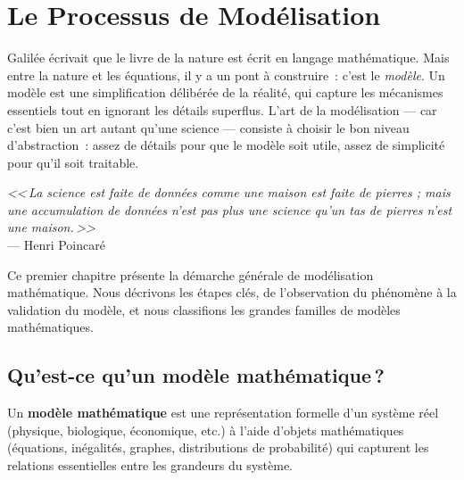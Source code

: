 \chapter{Le Processus de Mod\'elisation}
\label{ch:processus}

Galil\'ee \'ecrivait que le livre de la nature est \'ecrit en langage
math\'ematique. Mais entre la nature et les \'equations, il y a un pont \`a
construire~: c'est le \emph{mod\`ele}. Un mod\`ele est une simplification
d\'elib\'er\'ee de la r\'ealit\'e, qui capture les m\'ecanismes essentiels tout en
ignorant les d\'etails superflus. L'art de la mod\'elisation --- car c'est
bien un art autant qu'une science --- consiste \`a choisir le bon niveau
d'abstraction~: assez de d\'etails pour que le mod\`ele soit utile, assez de
simplicit\'e pour qu'il soit traitable.

\begin{center}
\textit{<<\,La science est faite de donn\'ees comme une maison est faite
de pierres ; mais une accumulation de donn\'ees n'est pas plus une
science qu'un tas de pierres n'est une maison.\,>>}\\[4pt]
--- Henri Poincar\'e
\end{center}

\bigskip

Ce premier chapitre pr\'esente la d\'emarche g\'en\'erale de mod\'elisation
math\'ematique.  Nous d\'ecrivons les \'etapes cl\'es, de l'observation du
ph\'enom\`ene \`a la validation du mod\`ele, et nous classifions les grandes
familles de mod\`eles math\'ematiques.

\section{Qu'est-ce qu'un mod\`ele math\'ematique\,?}

\begin{definition}
Un \textbf{mod\`ele math\'ematique} est une repr\'esentation formelle d'un
syst\`eme r\'eel (physique, biologique, \'economique, etc.) \`a l'aide
d'objets math\'ematiques (\'equations, in\'egalit\'es, graphes, distributions
de probabilit\'e) qui capturent les relations essentielles entre les
grandeurs du syst\`eme.
\end{definition}


